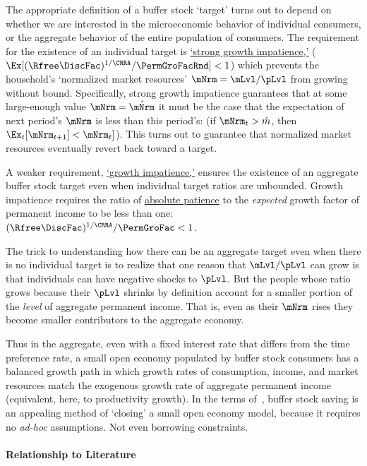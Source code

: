 \documentclass[BufferStockTheory]{subfiles}
\begin{document}
The appropriate definition of a buffer stock `target' turns out to depend on whether we are interested in the microeconomic behavior of individual consumers, or the aggregate behavior of the entire population of consumers.
The requirement for the existence of an individual target is \hyperlink{GICMod}{`strong growth impatience,'} ($\Ex[\APFacRaw/\PermGroFacRnd] < 1$) which prevents the household's `normalized market resources' $\mNrm = \mLvl/\pLvl$ from growing without bound.
Specifically, strong growth impatience guarantees that at some large-enough value $\mNrm = \acute{\mNrm}$ it must be the case that the expectation of next period's $\mNrm$ is less than this period's: (if $\mNrm_{t} > \acute{m}$, then $\Ex_{t}[\mNrm_{t+1}] < \mNrm_{t}]$). 
This turns out to guarantee that normalized market resources eventually revert back toward a target.

A weaker requirement, \hyperlink{GIC}{`growth impatience,'} ensures the existence of an aggregate buffer stock target even when individual target ratios are unbounded.
Growth impatience requires the ratio of \hyperlink{APFacDefn}{absolute patience} to the \textit{expected} growth factor of permanent income to be less than one: $\APFacRaw/\PermGroFac < 1$.


The trick to understanding how there can be an aggregate target even when there is no individual target is to realize that one reason that $\mLvl/\pLvl$ can grow is that individuals can have negative shocks to $\pLvl$.  But the people whose ratio grows because their $\pLvl$ shrinks by definition account for a smaller portion of the \textit{level} of aggregate permanent income. That is, even as their $\mNrm$ rises they become smaller contributors to the aggregate economy.  


Thus in the aggregate, even with a fixed interest rate that differs from the time preference rate, a small open economy populated by buffer stock consumers has a balanced growth path in which growth rates of consumption, income, and market resources match the exogenous growth rate of aggregate permanent income (equivalent, here, to productivity growth).
In the terms of~\cite{schmitt2003closing}, buffer stock saving is an appealing method of `closing' a small open economy model, because it requires no \textit{ad-hoc} assumptions.
Not even borrowing constraints.


\vspace{-1em}

\hypertarget{cfLiterature}{}
\hypertarget{DiffFromLit}{} 
\paragraph{Relationship to Literature}
\end{document}
